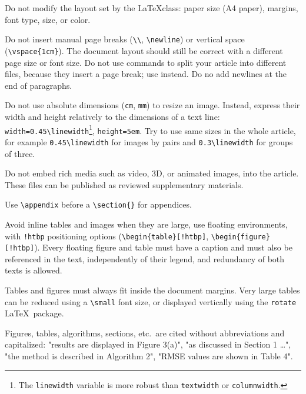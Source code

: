 \documentclass{ipol}
\begin{document}
Do not modify the layout set by the \LaTeX class: paper size (A4
paper), margins, font type, size, or color.

Do not insert manual page breaks (\verb|\\|, \verb|\newline|) or
vertical space (\verb|\vspace{1cm}|). The document layout should still
be correct with a different page size or font size. Do not use
\verb|| commands to split your article into different files,
because they insert a page break; use \verb|| instead.
Do no add newlines at the end of paragraphs.

Do not use absolute dimensions (\verb|cm|, \verb|mm|) to resize an
image. Instead, express their width and height relatively to the
dimensions of a text line: \verb|width=0.45\linewidth|\footnote{The
  \verb|linewidth| variable is more robust than \verb|textwidth| or
  \verb|columnwidth|.}, \verb|height=5em|. Try to use same sizes in
the whole article, for example \verb|0.45\linewidth| for images by
pairs and \verb|0.3\linewidth| for groups of three.

Do not embed rich media such as video, 3D, or animated images, into
the article. These files can be published as reviewed supplementary
materials.

Use \verb|\appendix| before a \verb|\section{}| for appendices.

Avoid inline tables and images when they are large, use floating
environments, with \verb|!htbp| positioning options
(\verb|\begin{table}[!htbp]|, \verb|\begin{figure}[!htbp]|). Every
floating figure and table must have a caption and must also be
referenced in the text, independently of their legend, and redundancy
of both texts is allowed.

Tables and figures must always fit inside the document margins. Very
large tables can be reduced using a \verb|\small| font size, or
displayed vertically using the \texttt{rotate} \LaTeX\ package.

Figures, tables, algorithms, sections, etc.\ are cited without
abbreviations and capitalized: "results are displayed in Figure
3(a)", "as discussed in Section 1 \ldots", "the method is described in
Algorithm 2", "RMSE values are shown in Table 4". 
\end{document}
